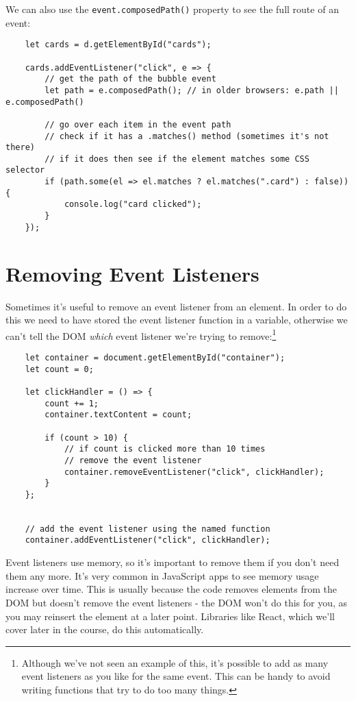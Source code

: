 We can also use the \texttt{event.composedPath()} property to see the full route of an event:

\begin{verbatim}
    let cards = d.getElementById("cards");

    cards.addEventListener("click", e => {
        // get the path of the bubble event
        let path = e.composedPath(); // in older browsers: e.path || e.composedPath()

        // go over each item in the event path
        // check if it has a .matches() method (sometimes it's not there)
        // if it does then see if the element matches some CSS selector
        if (path.some(el => el.matches ? el.matches(".card") : false)) {
            console.log("card clicked");
        }
    });
\end{verbatim}


\section{Removing Event Listeners}

Sometimes it's useful to remove an event listener from an element. In order to do this we need to have stored the event listener function in a variable, otherwise we can't tell the DOM \textit{which} event listener we're trying to remove:\footnote{Although we've not seen an example of this, it's possible to add as many event listeners as you like for the same event. This can be handy to avoid writing functions that try to do too many things.}

\begin{verbatim}
    let container = document.getElementById("container");
    let count = 0;

    let clickHandler = () => {
        count += 1;
        container.textContent = count;

        if (count > 10) {
            // if count is clicked more than 10 times
            // remove the event listener
            container.removeEventListener("click", clickHandler);
        }
    };


    // add the event listener using the named function
    container.addEventListener("click", clickHandler);
\end{verbatim}

Event listeners use memory, so it's important to remove them if you don't need them any more. It's very common in JavaScript apps to see memory usage increase over time. This is usually because the code removes elements from the DOM but doesn't remove the event listeners - the DOM won't do this for you, as you may reinsert the element at a later point. Libraries like React, which we'll cover later in the course, do this automatically.



